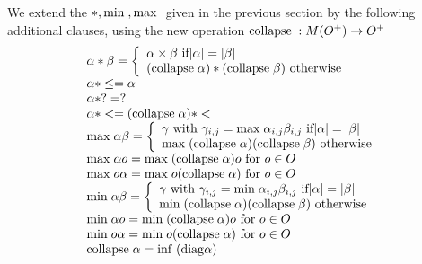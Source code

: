 \begin{definition}
We extend the $ *, \mathrm{min}\; , \mathrm{max}\; $ given in the previous section by the following additional clauses, using the new operation $\mathrm{collapse}\; : M(O^{+}) \rightarrow O^{+} $
\[
\begin{array}{ll}
\alpha * \beta = \left\{ \begin{array}{l}
                          \alpha \times \beta \mbox{ if} |\alpha| = | \beta | \\
                          (\mathrm{collapse}\; \alpha) * (\mathrm{collapse}\; \beta) \mbox{ otherwise}  
                          \end{array}\right. \\
\alpha * \leq = \alpha \\
\alpha * ? = ? \\
\alpha * < = (\mathrm{collapse}\; \alpha) * < \\

\mathrm{max}\; \alpha  \beta =  \left\{ \begin{array}{l}
                          \gamma \mbox{ with } \gamma_{i,j} = \mathrm{max}\; \alpha_{i,j} \beta_{i,j} \mbox{ if} |\alpha| = |\beta| \\
                          \mathrm{max}\; (\mathrm{collapse}\; \alpha) (\mathrm{collapse}\; \beta) \mbox{ otherwise}  
                          \end{array}\right. \\
\mathrm{max}\; \alpha o = \mathrm{max}\; (\mathrm{collapse}\; \alpha) o \mbox{ for } o \in O\\
\mathrm{max}\; o \alpha = \mathrm{max}\; o (\mathrm{collapse}\; \alpha) \mbox{ for } o \in O\\

\mathrm{min}\; \alpha  \beta =  \left\{ \begin{array}{l}
                          \gamma \mbox{ with } \gamma_{i,j} = \mathrm{min}\; \alpha_{i,j} \beta_{i,j} \mbox{ if} |\alpha| = |\beta| \\
                          \mathrm{min}\; (\mathrm{collapse}\; \alpha) (\mathrm{collapse}\; \beta) \mbox{ otherwise}  
                          \end{array}\right. \\
\mathrm{min}\; \alpha o = \mathrm{min}\; (\mathrm{collapse}\; \alpha) o \mbox{ for } o \in O\\
\mathrm{min}\; o \alpha = \mathrm{min}\; o (\mathrm{collapse}\; \alpha) \mbox{ for } o \in O\\

\mathrm{collapse}\; \alpha = \mathrm{inf}\; (\mathrm{diag} \alpha) 
\end{array}
\]
\end{definition}

